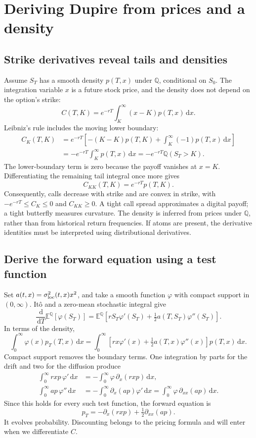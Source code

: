 \documentclass[10pt]{article}
\newcommand{\E}{\mathbb E}\newcommand{\Q}{\mathbb Q}\newcommand{\cF}{\mathcal F}
\newcommand{\dd}{\,\mathrm d}\newcommand{\Pp}{\mathbb P}\newcommand{\Var}{\operatorname{Var}}\newcommand{\Cov}{\operatorname{Cov}}
\theoremstyle{definition}\newtheorem{definition}{Definition}[section]
\begin{document}
\section{Deriving Dupire from prices and a density}
\subsection{Strike derivatives reveal tails and densities}
Assume \(S_T\) has a smooth density \(p(T,x)\) under \(\Q\), conditional on
\(S_0\). The integration variable \(x\) is a future stock price, and the
density does not depend on the option's strike:
\[
C(T,K)=e^{-rT}\int_K^\infty(x-K)p(T,x)\dd x.
\]
Leibniz's rule includes the moving lower boundary:
\begin{align*}
C_K(T,K)
&=e^{-rT}\left[-(K-K)p(T,K)+\int_K^\infty(-1)p(T,x)\dd x\right]\\
&=-e^{-rT}\int_K^\infty p(T,x)\dd x
=-e^{-rT}\Q(S_T>K).
\end{align*}
The lower-boundary term is zero because the payoff vanishes at \(x=K\).
Differentiating the remaining tail integral once more gives
\[
\boxed{C_{KK}(T,K)=e^{-rT}p(T,K).}
\]
Consequently, calls decrease with strike and are convex in strike, with
\(-e^{-rT}\leq C_K\leq0\) and \(C_{KK}\geq0\). A tight call spread
approximates a digital payoff; a tight butterfly measures curvature.
The density is inferred from prices under \(\Q\), rather than from
historical return frequencies. If atoms are present, the derivative
identities must be interpreted using distributional derivatives.

\subsection{Derive the forward equation using a test function}
Set \(a(t,x)=\sigma_{\rm loc}^2(t,x)x^2\), and take a smooth function
\(\varphi\) with compact support in \((0,\infty)\). It\^o and a zero-mean
stochastic integral give
\[
\frac{\dd}{\dd T}\E^\Q[\varphi(S_T)]
=\E^\Q\left[rS_T\varphi'(S_T)+\tfrac12a(T,S_T)\varphi''(S_T)\right].
\]
In terms of the density,
\[
\int_0^\infty\varphi(x)p_T(T,x)\dd x
=\int_0^\infty\left[rx\varphi'(x)+\tfrac12a(T,x)\varphi''(x)\right]p(T,x)\dd x.
\]
Compact support removes the boundary terms. One integration by parts for
the drift and two for the diffusion produce
\begin{align*}
\int_0^\infty rxp\,\varphi'\dd x
&=-\int_0^\infty\varphi\,\partial_x(rxp)\dd x,\\
\int_0^\infty ap\,\varphi''\dd x
&=-\int_0^\infty\partial_x(ap)\varphi'\dd x
=\int_0^\infty\varphi\,\partial_{xx}(ap)\dd x.
\end{align*}
Since this holds for every such test function, the forward equation is
\[
\boxed{p_T=-\partial_x(rxp)+\tfrac12\partial_{xx}(ap).}
\]
It evolves probability. Discounting belongs to the pricing formula and
will enter when we differentiate \(C\).
\end{document}
